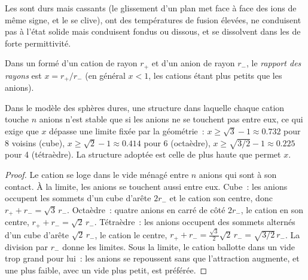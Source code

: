 \begin{proposition}\label{prop:b1:crystals-ionic-covalent:ionic-properties}
Les  sont durs mais cassants (le glissement d'un plan
met face à face des ions de même signe, et le  se clive), ont des
températures de fusion élevées, ne conduisent pas à l'état solide mais
conduisent fondus ou dissous, et se dissolvent dans les  de forte permittivité.
\end{proposition}
\admitted

\begin{definition}\label{def:b1:crystals-ionic-covalent:radius-ratio}
Dans un  formé d'un cation de rayon $r_+$ et d'un anion
de rayon $r_-$, le \emph{rapport des rayons} est $x = r_+/r_-$
(en général $x < 1$, les cations étant plus petits que les anions).
\end{definition}

\begin{proposition}\label{prop:b1:crystals-ionic-covalent:rule}
Dans le modèle des sphères dures, une structure dans laquelle chaque
cation touche $n$ anions n'est stable que si les anions ne se touchent
pas entre eux, ce qui exige que $x$ dépasse une limite fixée par la
géométrie~: $x \ge \sqrt3 - 1
\approx 0.732$ pour 8 voisins (cube), $x \ge \sqrt2 - 1 \approx 0.414$
pour 6 (octaèdre), $x \ge \sqrt{3/2} - 1 \approx 0.225$ pour 4
(tétraèdre). La structure adoptée est celle de plus haute 
que permet $x$.
\end{proposition}

\begin{proof}
Le cation se loge dans le vide ménagé entre $n$ anions qui sont à son
contact. À la limite, les anions se touchent aussi entre eux. Cube~: les
anions occupent les sommets d'un cube d'arête $2r_-$ et le cation son
centre, donc $r_+ +
r_- = \sqrt3\,r_-$. Octaèdre~: quatre anions en carré de côté $2r_-$, le
cation en son centre, $r_+ + r_- = \sqrt2\,r_-$. Tétraèdre~: les anions
occupent des sommets alternés d'un cube d'arête $\sqrt2\,r_-$, le cation
le centre, $r_+ + r_- = \frac{\sqrt3}{2}\sqrt2\,r_- = \sqrt{3/2}\,r_-$.
La division par $r_-$ donne les limites. Sous la limite, le cation
ballotte dans un vide trop grand pour lui~: les anions se repoussent sans
que l'attraction augmente, et une  plus faible, avec un vide
plus petit, est préférée.
\end{proof}

